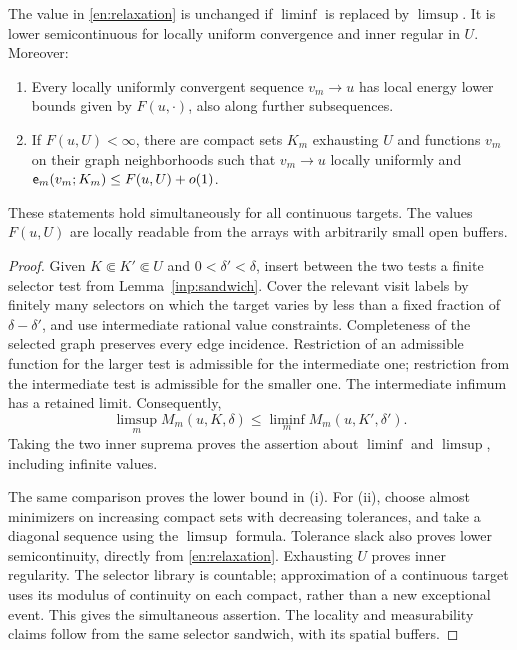 \begin{lemma}\label{en:envelope}
The value in \eqref{en:relaxation} is unchanged if $\liminf$ is replaced
by $\limsup$.  It is lower semicontinuous for locally uniform convergence
and inner regular in $U$.  Moreover:
\begin{enumerate}[label=\textup{(\roman*)}]
\item Every locally uniformly convergent sequence $v_m\to u$ has local
energy lower bounds given by $F(u,\cdot)$, also along further
subsequences.
\item If $F(u,U)<\infty$, there are compact sets $K_m$ exhausting $U$
and functions $v_m$ on their graph neighborhoods such that $v_m\to u$
locally uniformly and
$\mathsf e_m(v_m;K_m)\le F(u,U)+o(1)$.
\end{enumerate}
These statements hold simultaneously for all continuous targets.  The
values $F(u,U)$ are locally readable from the arrays with arbitrarily
small open buffers.
\end{lemma}

\begin{proof}
Given $K\Subset K'\Subset U$ and $0<\delta'<\delta$, insert between the
two tests a finite selector test from Lemma~\ref{inp:sandwich}.  Cover
the relevant visit labels by finitely many selectors on which the target
varies by less than a fixed fraction of $\delta-\delta'$, and use
intermediate rational value constraints.  Completeness of the selected
graph preserves every edge incidence.  Restriction of an admissible
function for the larger test is admissible for the intermediate one;
restriction from the intermediate test is admissible for the smaller
one.  The intermediate infimum has a retained limit.  Consequently,
\[
 \limsup_m M_m(u,K,\delta)
 \le \liminf_m M_m(u,K',\delta').
\]
Taking the two inner suprema proves the assertion about $\liminf$ and
$\limsup$, including infinite values.

The same comparison proves the lower bound in (i).  For (ii), choose
almost minimizers on increasing compact sets with decreasing
tolerances, and take a diagonal sequence using the $\limsup$ formula.
Tolerance slack also proves lower semicontinuity, directly from
\eqref{en:relaxation}.  Exhausting $U$ proves inner regularity.  The
selector library is countable; approximation of a continuous target
uses its modulus of continuity on each compact, rather than a new
exceptional event.  This gives the simultaneous assertion.  The
locality and measurability claims follow from the same selector
sandwich, with its spatial buffers.
\end{proof}

